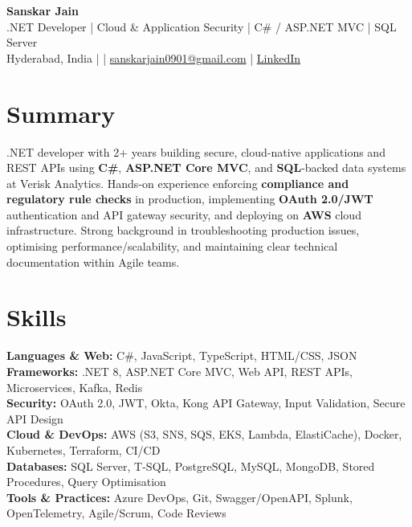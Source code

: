 \documentclass[10pt,letterpaper]{article}
\begin{document}
\begin{center}
    {\Large \textbf{Sanskar Jain}} \\
    .NET Developer \;|\; Cloud \& Application Security \;|\; C\# / ASP.NET MVC \;|\; SQL Server \\
    Hyderabad, India \enspace |  \enspace | \enspace
    \href{mailto:sanskarjain0901@gmail.com}{sanskarjain0901@gmail.com} \enspace | \enspace
    \href{https://www.linkedin.com/in/sanskar-jain0901/}{LinkedIn}
\end{center}

\vspace{2pt}

\section*{Summary}
.NET developer with 2+ years building secure, cloud-native applications and REST APIs using \textbf{C\#}, \textbf{ASP.NET Core MVC}, and \textbf{SQL}-backed data systems at Verisk Analytics. Hands-on experience enforcing \textbf{compliance and regulatory rule checks} in production, implementing \textbf{OAuth 2.0/JWT} authentication and API gateway security, and deploying on \textbf{AWS} cloud infrastructure. Strong background in troubleshooting production issues, optimising performance/scalability, and maintaining clear technical documentation within Agile teams.

\section*{Skills}
\textbf{Languages \& Web:} C\#, JavaScript, TypeScript, HTML/CSS, JSON \\
\textbf{Frameworks:} .NET 8, ASP.NET Core MVC, Web API, REST APIs, Microservices, Kafka, Redis \\
\textbf{Security:} OAuth 2.0, JWT, Okta, Kong API Gateway, Input Validation, Secure API Design \\
\textbf{Cloud \& DevOps:} AWS (S3, SNS, SQS, EKS, Lambda, ElastiCache), Docker, Kubernetes, Terraform, CI/CD \\
\textbf{Databases:} SQL Server, T-SQL, PostgreSQL, MySQL, MongoDB, Stored Procedures, Query Optimisation \\
\textbf{Tools \& Practices:} Azure DevOps, Git, Swagger/OpenAPI, Splunk, OpenTelemetry, Agile/Scrum, Code Reviews
\end{document}
